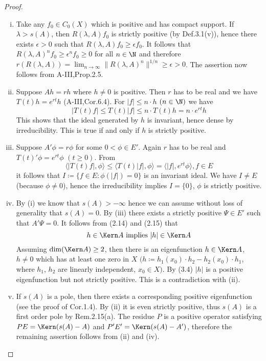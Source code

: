 \begin{proof} 
\begin{enumerate}[(i), wide]
	\item 
	Take any $f_{0} \in C_{0}(X)$ which is positive and has compact support.
	If $\lambda > s(A)$, then $R(\lambda,A)f_{0}$ is strictly positive (by Def.3.1(v)), hence there exists $\epsilon > 0$ such that $R(\lambda,A)f_{0} \geq \epsilon f_{0}$.
	It follows that $R(\lambda,A)^nf_{0} \geq \epsilon^nf_{0} \geq 0$ for all $n \in \N$ and therefore
%
%
%		
	$r(R(\lambda,A)) = \lim_{n \to \infty}\|R(\lambda,A)^{n}\|^{1/n} \geq \epsilon > 0 $.
	The assertion now follows from A-III,Prop.2.5.
	

	\item 
	Suppose $Ah = rh$ where $h \neq 0$ is positive.
	Then $r$ has to be real and we have $T(t)h = e^{rt}h$ (A-III,Cor.6.4).
	For $|f| \leq n\cdot h$ $(n \in \N)$ we have
	\begin{equation}
		|T(t)f| \leq T(t)|f| \leq n\cdot T(t)h = n\cdot e^{rt}h		
	\end{equation}
		This shows that the ideal generated by $h$ is invariant, hence dense by irreducibility.
	This is true if and only if $h$ is strictly positive.
	
	\item 
	Suppose $A'\phi = r\phi$ for some $0 < \phi \in E'$.
	Again $r$ has to be real and $T(t)'\phi = e^{rt}\phi$ $(t \geq 0)$.
	From
	\begin{equation}
	\langle|T(t)f|,\phi\rangle \leq \langle T(t)|f|,\phi\rangle = \langle|f|,e^{rt}\phi\rangle, f \in E			
	\end{equation}
	it follows that $I \coloneq \{f \in E : \phi(|f|) = 0\}$ is an invariant ideal.
	We have $I \neq E$ (because $\phi \neq 0$), hence the irreducibility implies $I = \{0\}$, \ie $\phi$ is strictly positive.
	
	\item 
	By (i) we know that $s(A) > -\infty$ hence we can assume without loss of generality that $s(A) = 0$.
	By (iii) there exists a strictly positive $\Psi \in E'$ such that $A'\Psi = 0$.
	It follows from (2.14) and (2.15) that
	\begin{equation}
	h \in \Kern A \text{ implies } |h| \in \Kern A
	\end{equation}
	Assuming $\dim(\Kern A) \geq 2$, then there is an eigenfunction $h \in \Kern A$, $h \neq 0$ which has at least one zero in $X$ $(h \coloneq h_{1}(x_{0})\cdot h_{2} - h_{2}(x_{0})\cdot h_{1}$, where $h_{1}$, $h_{2}$ are linearly independent, $x_{0} \in X)$.
	By (3.4) $|h|$ is a positive eigenfunction but not strictly positive.
	This is a contradiction with (ii).
	
	\item 
	If $s(A)$ is a pole, then there exists a corresponding positive eigenfunction (see the proof of Cor.1.4).
	By (ii) it is even strictly positive, thus $s(A)$ is a first order pole by Rem.2.15(a).
	The residue $P$ is a positive operator satisfying $PE = \Kern(s(A) - A)$ and $P'E' = \Kern(s(A) - A')$, therefore the remaining assertion follows from (ii) and (iv).
	\end{enumerate}
	\end{proof}

